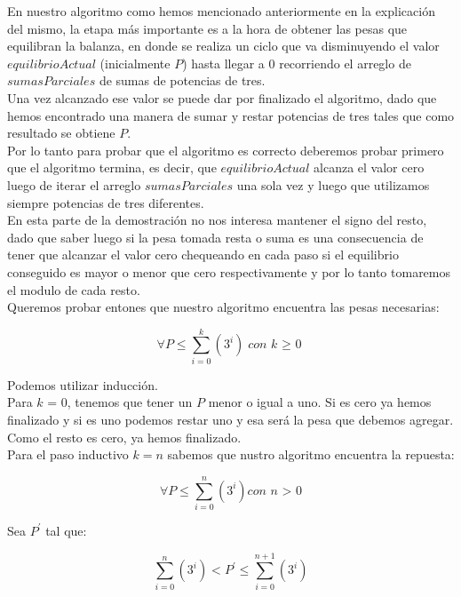 En nuestro algoritmo como hemos mencionado anteriormente en la explicaci\'on del mismo, la etapa m\'as importante es a la hora de obtener las pesas que equilibran la balanza, en donde se realiza un ciclo que va disminuyendo el valor $equilibrioActual$ (inicialmente $P$) hasta llegar a 0 recorriendo el arreglo de $sumasParciales$ de sumas de potencias de tres.\\
Una vez alcanzado ese valor se puede dar por finalizado el algoritmo, dado que hemos encontrado una manera de sumar y restar potencias de tres tales que como resultado se obtiene $P$.\\

Por lo tanto para probar que el algoritmo es correcto deberemos probar primero que el algoritmo termina, es decir, que $equilibrioActual$ alcanza el valor cero luego de iterar el arreglo $sumasParciales$ una sola vez y luego que utilizamos siempre potencias de tres diferentes.\\

En esta parte de la demostración no nos interesa mantener el signo del resto, dado que saber luego si la pesa tomada resta o suma es una consecuencia de tener que alcanzar el valor cero chequeando en cada paso si el equilibrio conseguido es mayor o menor que cero respectivamente y por lo tanto tomaremos el modulo de cada resto.\\

Queremos probar entones que nuestro algoritmo encuentra las pesas necesarias:

\begin{equation}
\forall P \leq \sum_{i=0}^{k}(3^i) \textit{con k $\geq$ 0}
\end{equation}

Podemos utilizar inducción.\\

Para $k$ = 0, tenemos que tener un $P$ menor o igual a uno. Si es cero ya hemos finalizado y si es uno podemos restar uno y esa será la pesa que debemos agregar. Como el resto es cero, ya hemos finalizado.\\

Para el paso inductivo $k = n$ sabemos que nustro algoritmo encuentra la repuesta:

\begin{equation}
\forall P \leq \sum_{i=0}^{n}(3^i) \textit{con n > 0}
\end{equation}

Sea $P^{'}$  tal que: 

\begin{equation}
\sum_{i=0}^{n}(3^i) <  P^{'} \leq \sum_{i=0}^{n+1}(3^i) 
\end{equation}

